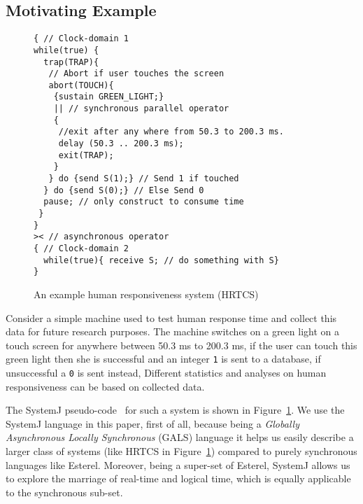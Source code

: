 \subsection{Motivating Example}
\label{sec:motivating-example}

\begin{figure}[t!]
\begin{minipage}{5cm}
  \begin{scriptsize}
    
\begin{verbatim}
{ // Clock-domain 1
while(true) {
  trap(TRAP){
   // Abort if user touches the screen
   abort(TOUCH){
    {sustain GREEN_LIGHT;}
    || // synchronous parallel operator
    {
     //exit after any where from 50.3 to 200.3 ms.
     delay (50.3 .. 200.3 ms);
     exit(TRAP); 
    }
   } do {send S(1);} // Send 1 if touched 
  } do {send S(0);} // Else Send 0
  pause; // only construct to consume time
 }
}
>< // asynchronous operator
{ // Clock-domain 2
  while(true){ receive S; // do something with S}
}
\end{verbatim}
  \end{scriptsize}
\end{minipage}
\caption{An example human responsiveness system (HRTCS)}
\label{fig:1}
\end{figure}

Consider a simple machine used to test human response time and collect
this data for future research purposes. The machine switches on a green
light on a touch screen for anywhere between 50.3 ms to 200.3 ms, if the
user can touch this green light then she is successful and an integer
\texttt{1} is sent to a database, if unsuccessful a \texttt{0} is sent
instead, Different statistics and analyses on human responsiveness can
be based on collected data.

The SystemJ pseudo-code~\cite{amal10} for such a system is shown in
Figure~\ref{fig:1}. We use the SystemJ language in this paper, first of
all, because being a \textit{Globally Asynchronous Locally Synchronous}
(GALS) language it helps us easily describe a larger class of systems
(like HRTCS in Figure~\ref{fig:1}) compared to purely synchronous
languages like Esterel. Moreover, being a super-set of Esterel, SystemJ
allows us to explore the marriage of real-time and logical time, which
is equally applicable to the synchronous sub-set.

